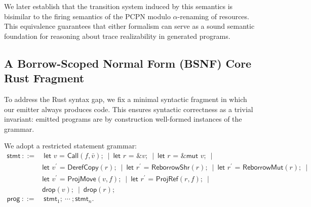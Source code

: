 \documentclass[runningheads]{llncs}
\begin{document}
We later establish that the transition system induced by this semantics is bisimilar to the firing semantics of the PCPN modulo $\alpha$-renaming of resources. This equivalence guarantees that either formalism can serve as a sound semantic foundation for reasoning about trace realizability in generated programs.

\subsection{A Borrow-Scoped Normal Form (BSNF) Core Rust Fragment}
\label{sec:background:core}

To address the Rust syntax gap, we fix a minimal syntactic fragment in which our emitter always produces code. This ensures syntactic correctness as a trivial invariant: emitted programs are by construction well-formed instances of the grammar.

We adopt a restricted statement grammar:
\begin{align*}
\textsf{stmt}~::=&~
\textsf{let }v\textsf{ = } \textsf{Call}(f,\bar v);\ \mid\
\textsf{let }r\textsf{ = \&}v;\ \mid\
\textsf{let }r\textsf{ = \&mut }v;\ \mid\\
&\textsf{let }v^{\prime}\textsf{ = DerefCopy}(r);\ \mid\
\textsf{let }r^{\prime}\textsf{ = ReborrowShr}(r);\ \mid\
\textsf{let }r^{\prime}\textsf{ = ReborrowMut}(r);\ \mid\\
&\textsf{let }v^{\prime}\textsf{ = ProjMove}(v,f);\ \mid\
\textsf{let }r^{\prime}\textsf{ = ProjRef}(r,f);\ \mid\\
&\textsf{drop}(v);\ \mid\ \textsf{drop}(r);\\
\textsf{prog}~::=&~ \textsf{stmt}_1;\ \cdots\ ;\textsf{stmt}_n.
\end{align*}
\end{document}
